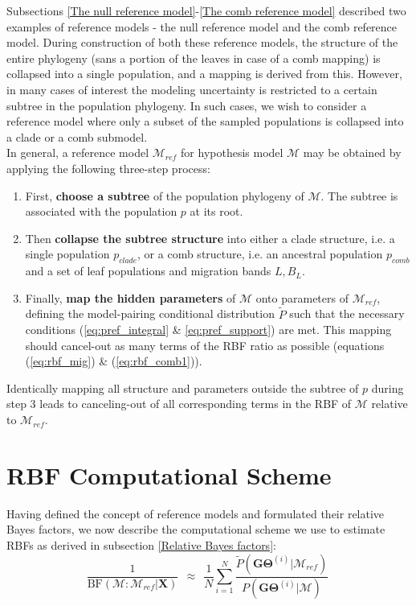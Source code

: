 \documentclass[11pt]{article}
\newcommand{\vect}[1]{\boldsymbol{\mathbf{#1}}}
\newcommand{\X}{\vect{X}}
\newcommand{\M}{\mathcal{M}}
\newcommand{\G}{\vect{G}}
\newcommand{\T}{\vect{\Theta}}
\newcommand{\GT}{\G\T}
\newcommand{\Mref}{\M_{ref}}
\newcommand{\Pref}{\widetilde{P}}
\newcommand{\rbf}{\text{BF}}
\newcommand{\1}{\mathbbm{1}}
\begin{document}
Subsections \ref{The null reference model}-\ref{The comb reference model} described two examples of reference models - the null reference model and the comb reference model. 
%
During construction of both these reference models, the structure of the entire phylogeny (sans a portion of the leaves in case of a comb mapping) is collapsed into a single population, and a mapping is derived from this.
%
However, in many cases of interest the modeling uncertainty is restricted to a certain subtree in the population phylogeny.
%
In such cases, we wish to consider a reference model where only a subset of the sampled populations is collapsed into a clade or a comb submodel.\\
%
In general, a reference model $\Mref$ for hypothesis model $\M$ may be obtained by applying the following three-step process:

\begin{enumerate}
\item First, \textbf{choose a subtree} of the population phylogeny of $\M$. The subtree is associated with the population $p$ at its root. 

\item Then \textbf{collapse the subtree structure} into either a clade structure, i.e. a single population $p_{clade}$, or a comb structure, i.e. an ancestral population $p_{comb}$ and a set of leaf populations and migration bands $L, B_L$. 

\item Finally, \textbf{map the hidden parameters} of $\M$ onto parameters of $\Mref$, defining the model-pairing conditional distribution $\Pref$ such that the necessary conditions (\ref{eq:pref_integral} \& \ref{eq:pref_support}) are met. This mapping should cancel-out as many terms of the RBF ratio as possible (equations (\ref{eq:rbf_mig}) \& (\ref{eq:rbf_comb1})).
\end{enumerate}

Identically mapping all structure and parameters outside the subtree of $p$ during step 3 leads to canceling-out of all corresponding terms in the RBF of $\M$ relative to $\Mref$.

\section{RBF Computational Scheme} \label{sec:RBF Computational Scheme}

Having defined the concept of reference models and formulated their relative Bayes factors, we now describe the computational scheme we use to estimate RBFs as derived in subsection \ref{Relative Bayes factors}:
%
\begin{equation}
\label{eq:computational_scheme}
 \frac{1}{\rbf(\M:\Mref|\X)}  ~~\approx~~ \frac{1}{N} \sum_{i=1}^{N}\frac{\Pref(\GT^{(i)}|\Mref) }{P(\GT^{(i)}|\M)} ~ 
\end{equation}
\end{document}
